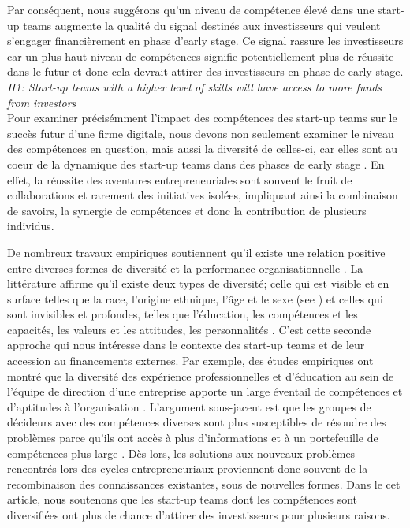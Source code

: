 \documentclass[12pt]{article}
\begin{document}
Par conséquent, nous suggérons qu'un niveau de compétence élevé dans une start-up teams augmente la qualité du signal destinés aux investisseurs qui veulent s'engager financièrement en phase d'early stage. Ce signal rassure les investisseurs car un plus haut niveau de compétences signifie potentiellement plus de réussite dans le futur et donc cela devrait attirer des investisseurs en phase de early stage. \\

\noindent \textit{H1: Start-up teams with a higher level of skills will have access to more funds from investors} \\

Pour examiner précisémment l'impact des compétences des start-up teams sur le succès futur d'une firme digitale, nous devons non seulement examiner le niveau des compétences en question, mais aussi la diversité de celles-ci, car elles sont au coeur de la dynamique des start-up teams dans des phases de early stage \citep{grillitsch2021does}. En effet, la réussite des aventures entrepreneuriales sont souvent le fruit de collaborations et rarement des initiatives isolées, impliquant ainsi la combinaison de savoirs, la synergie de compétences et donc la contribution de plusieurs individus.

De nombreux travaux empiriques soutiennent qu'il existe une relation positive entre diverses formes de diversité et la performance organisationnelle \citep{zhou2015entrepreneurial}. La littérature affirme qu'il existe deux types de diversité; celle qui est visible et en surface telles que la race, l'origine ethnique, l'âge et le sexe (see \citep{wise2022startup}) et celles qui sont invisibles et profondes, telles que l'éducation, les compétences et les capacités, les valeurs et les attitudes, les personnalités \citep{bell2007deep}. C'est cette seconde approche qui nous intéresse dans le contexte des start-up teams et de leur accession au financements externes. Par exemple, des études empiriques ont montré que la diversité des expérience professionnelles et d'éducation au sein de l'équipe de direction d'une entreprise apporte un large éventail de compétences et d'aptitudes à l'organisation \citep{beckman2007early, zarutskie2010role}. L'argument sous-jacent est que les groupes de décideurs avec des compétences diverses sont plus susceptibles de résoudre des problèmes parce qu'ils ont accès à plus d'informations et à un portefeuille de compétences plus large \citep{hong2001problem}. Dès lors, les solutions aux nouveaux problèmes rencontrés lors des cycles entrepreneuriaux proviennent donc souvent de la recombinaison des connaissances existantes, sous de nouvelles formes. Dans le cet article, nous soutenons que les start-up teams dont les compétences sont diversifiées ont plus de chance d'attirer des investisseurs pour plusieurs raisons.
\end{document}

